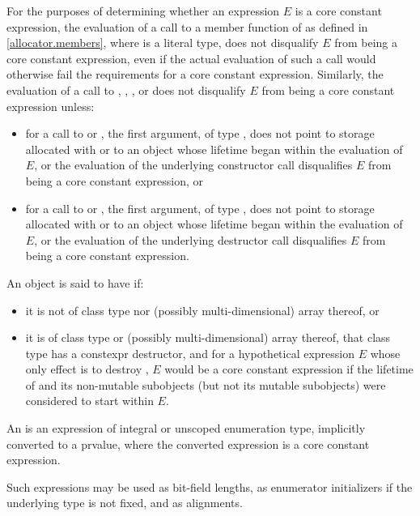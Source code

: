 \pnum
For the purposes of determining
whether an expression $E$ is a core constant expression,
the evaluation of a call to a member function of 
as defined in \ref{allocator.members}, where  is a literal type,
does not disqualify $E$ from being a core constant expression,
even if the actual evaluation of such a call
would otherwise fail the requirements for a core constant expression.
Similarly, the evaluation of a call to
,
,
, or
does not disqualify $E$
from being a core constant expression unless:
\begin{itemize}
\item
  for a call to  or ,
  the first argument, of type ,
  does not point
  to storage allocated with  or
  to an object whose lifetime began within the evaluation of $E$, or
  the evaluation of the underlying constructor call
  disqualifies $E$ from being a core constant expression, or
\item
  for a call to  or ,
  the first argument, of type ,
  does not point
  to storage allocated with  or
  to an object whose lifetime began within the evaluation of $E$, or
  the evaluation of the underlying destructor call
  disqualifies $E$ from being a core constant expression.
\end{itemize}

\pnum
An object  is said to have  if:
\begin{itemize}
\item
  it is not of class type nor (possibly multi-dimensional) array thereof, or
\item
  it is of class type or (possibly multi-dimensional) array thereof,
  that class type has a constexpr destructor, and
  for a hypothetical expression $E$
  whose only effect is to destroy ,
  $E$ would be a core constant expression
  if the lifetime of  and its non-mutable subobjects
  (but not its mutable subobjects) were considered to start within $E$.
\end{itemize}

\pnum
An 
is an expression of integral or
unscoped enumeration type, implicitly converted to a prvalue, where the converted expression is a core constant expression.
\begin{note}
Such expressions may be
used as bit-field lengths, as enumerator
initializers if the underlying type is not fixed,
and as alignments.
\end{note}

